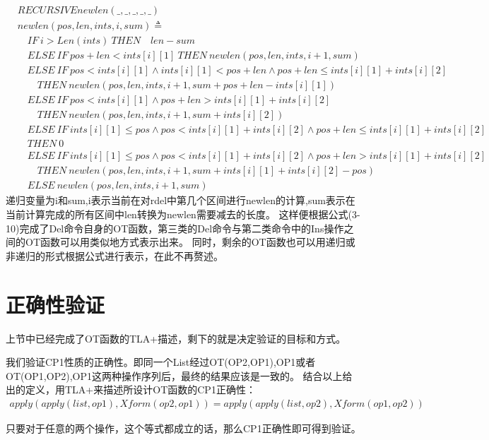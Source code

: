 \begin{align*}  
&RECURSIVE newlen(\_,\_,\_,\_,\_)     \\
&newlen(pos,len,ints,i,sum) \triangleq\\
    & \quad IF\ i > Len(ints) \ THEN \quad len - sum\\
    & \quad ELSE \ IF \ pos + len < ints[i][1] \ THEN \ newlen(pos,len,ints,i+1,sum)\\
    & \quad ELSE \ IF \ pos < ints[i][1] \land ints[i][1] < pos + len \land pos + len \le ints[i][1] + ints[i][2]\\
    & \quad \quad THEN \ newlen(pos,len,ints,i+1,sum + pos + len -ints[i][1])\\
    & \quad ELSE \ IF \ pos < ints[i][1] \land pos + len > ints[i][1] + ints[i][2]\\
    & \quad \quad THEN \ newlen(pos,len,ints,i+1,sum + ints[i][2])\\
    & \quad ELSE \ IF \ ints[i][1] \le pos \land pos < ints[i][1] + ints[i][2] \land pos + len \le ints[i][1] + ints[i][2]\\
    & \quad THEN \ 0\\
    & \quad ELSE \ IF\ ints[i][1] \le pos \land pos < ints[i][1] + ints[i][2] \land pos + len > ints[i][1] + ints[i][2] \\
    & \quad \quad THEN \ newlen(pos,len,ints,i+1,sum + ints[i][1] + ints[i][2] - pos)    \\
    & \quad ELSE \ newlen(pos,len,ints,i+1,sum)
\end{align*}
递归变量为i和sum,i表示当前在对rdel中第几个区间进行newlen的计算,sum表示在当前计算完成的所有区间中len转换为newlen需要减去的长度。
这样便根据公式(3-10)完成了Del命令自身的OT函数，第三类的Del命令与第二类命令中的Ins操作之间的OT函数可以用类似地方式表示出来。
同时，剩余的OT函数也可以用递归或非递归的形式根据公式进行表示，在此不再赘述。
\section{正确性验证}
上节中已经完成了OT函数的TLA+描述，剩下的就是决定验证的目标和方式。

我们验证CP1性质的正确性。即同一个List经过OT(OP2,OP1),OP1或者OT(OP1,OP2),OP1这两种操作序列后，最终的结果应该是一致的。
结合以上给出的定义，用TLA+来描述所设计OT函数的CP1正确性：
\begin{align*}
  apply(apply(list,op1),Xform(op2, op1)) = apply(apply(list,op2),Xform(op1, op2))
\end{align*}
\par 只要对于任意的两个操作，这个等式都成立的话，那么CP1正确性即可得到验证。

